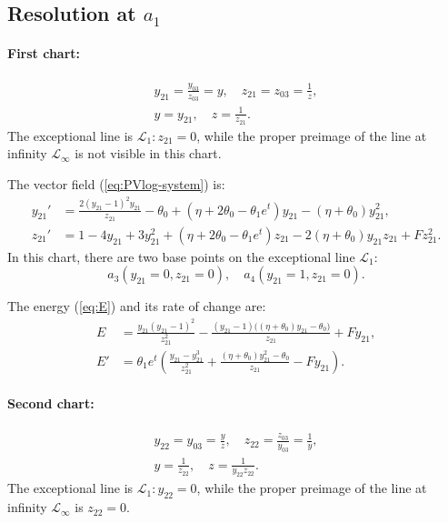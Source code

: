 \subsection{Resolution at $a_1$}\label{a1-blow}
\paragraph{First chart:}
\begin{gather*}
 y_{21}=\frac{y_{03}}{z_{03}}=y,
 \quad
z_{21}=z_{03}=\frac1z,
\\
y=y_{21},
\quad
z=\frac{1}{z_{21}}.
\end{gather*}
The exceptional line is $\mathcal{L}_1 : z_{21}=0$, while the proper preimage of the line at infinity $\mathcal{L}_{\infty}$ is not visible in this chart. 


The vector field (\ref{eq:PVlog-system}) is:
$$
\begin{aligned}
y_{21}'&=
\frac{ 2 ( y_{21}-1)^2 y_{21}}{z_{21}}
-\theta_0 + (\eta + 2 \theta_0- \theta_1 e^t) y_{21} - (\eta + \theta_0) y_{21}^2 
,
\\
z_{21}'&=1 - 4 y_{21} + 3 y_{21}^2 + (\eta + 2 \theta_0-\theta_1e^t  ) z_{21} - 2 (\eta+ \theta_0) y_{21} z_{21} + F z_{21}^2
.
\end{aligned}
$$
In this chart, there are two base points on the exceptional line $\mathcal{L}_1$:
$$
a_3(y_{21}=0,z_{21}=0),
\quad
a_4(y_{21}=1,z_{21}=0).
$$

The energy (\ref{eq:E}) and its rate of change are:
$$
\begin{aligned}
E&=
\frac{y_{21} (y_{21}-1)^2}{z_{21}^2}
-\frac{(y_{21}-1) \big((\eta +\theta_0) y_{21}-\theta_0\big)}{z_{21}}
+F y_{21}
,
\\
E'&=
\theta_1 e^t
\left(
\frac{y_{21}-y_{21}^3}{z_{21}^2}
+
\frac{(\eta+\theta_0) y_{21}^2-\theta_0}{z_{21}}-F y_{21}
\right)
. 
\end{aligned}
$$

\paragraph{Second chart:}
\begin{gather*}
y_{22}=y_{03}=\frac{y}{z},
\quad
z_{22}=\frac{z_{03}}{y_{03}}=\frac1y,
\\
y=\frac1{z_{22}},
\quad
z=\frac1{y_{22}z_{22}}.
\end{gather*}
The exceptional line is $\mathcal{L}_1 : y_{22}=0$, while the proper preimage of the line at infinity $\mathcal{L}_{\infty}$ is $z_{22}=0$. 

